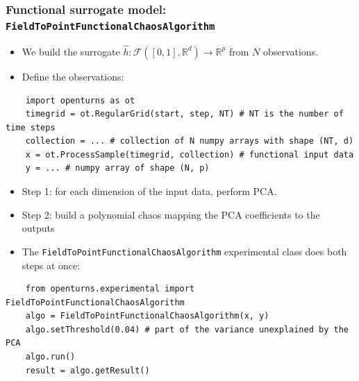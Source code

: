 \documentclass{beamer}
\begin{document}
  
  
  \begin{frame}[containsverbatim]
  \frametitle{Functional surrogate model: \texttt{FieldToPointFunctionalChaosAlgorithm}}
  
  \begin{itemize}
    \item We build the surrogate $\hat{h} : \mathcal{F}([0, 1], \mathbb{R}^d) \rightarrow \mathbb{R}^p$ from $N$ observations.
    \item Define the observations:
  \end{itemize}

    \begin{lstlisting}
    import openturns as ot
    timegrid = ot.RegularGrid(start, step, NT) # NT is the number of time steps
    collection = ... # collection of N numpy arrays with shape (NT, d)
    x = ot.ProcessSample(timegrid, collection) # functional input data
    y = ... # numpy array of shape (N, p)
    \end{lstlisting}
    
    \begin{itemize}
    \item Step 1: for each dimension of the input data, perform PCA.
    \item Step 2: build a polynomial chaos mapping the PCA coefficients to the outputs
    \item The \texttt{FieldToPointFunctionalChaosAlgorithm} experimental class does both steps at once:
    \end{itemize}

    \begin{lstlisting}
    from openturns.experimental import FieldToPointFunctionalChaosAlgorithm
    algo = FieldToPointFunctionalChaosAlgorithm(x, y)
    algo.setThreshold(0.04) # part of the variance unexplained by the PCA
    algo.run()
    result = algo.getResult()
    \end{lstlisting} 
  

  \end{frame}
  
  
  
\end{document}
